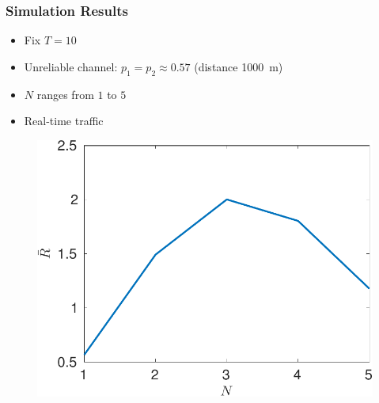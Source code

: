 \documentclass{beamer}
\begin{document}
\begin{frame}
\frametitle{Simulation Results}
\begin{itemize}
  \item Fix $T=10$
\item Unreliable channel: $p_1 = p_2 \approx 0.57$ (distance \SI{1000}{m})
\item $N$ ranges from $1$ to $5$
\item Real-time traffic
\end{itemize}
\begin{figure}[htbp]
  \centering
  \includegraphics[height=.5\textheight]{realtime_throughput_N.pdf}
\end{figure}
\end{frame}
\end{document}
